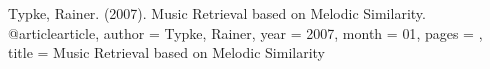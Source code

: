 Typke, Rainer. (2007). Music Retrieval based on Melodic Similarity. 
@article{article,
author = {Typke, Rainer},
year = {2007},
month = {01},
pages = {},
title = {Music Retrieval based on Melodic Similarity}
}